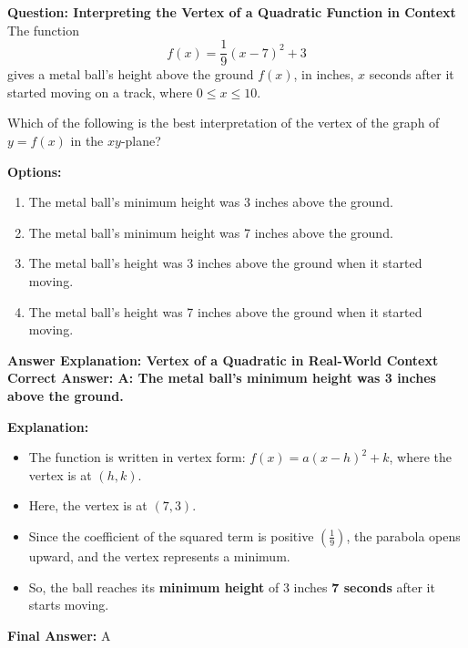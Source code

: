 \documentclass{beamer}
\begin{document}
\begin{frame}{\textbf{Question: Interpreting the Vertex of a Quadratic Function in Context}}
The function 
\[
f(x) = \frac{1}{9}(x - 7)^2 + 3
\]
gives a metal ball's height above the ground \(f(x)\), in inches, \(x\) seconds after it started moving on a track, where \(0 \leq x \leq 10\). 

Which of the following is the best interpretation of the vertex of the graph of \(y = f(x)\) in the \(xy\)-plane?

\vspace{0.4cm}
\textbf{Options:}
\begin{enumerate}
    \item[A] The metal ball's minimum height was 3 inches above the ground.
    \item[B] The metal ball's minimum height was 7 inches above the ground.
    \item[C] The metal ball's height was 3 inches above the ground when it started moving.
    \item[D] The metal ball's height was 7 inches above the ground when it started moving.
\end{enumerate}
\end{frame}

\begin{frame}{\textbf{Answer Explanation: Vertex of a Quadratic in Real-World Context}}
\textbf{Correct Answer: \textcolor{novelGreen}{A: The metal ball's minimum height was 3 inches above the ground.}}

\vspace{0.3cm}
\textbf{Explanation:}
\begin{itemize}
    \item The function is written in vertex form: \(f(x) = a(x - h)^2 + k\), where the vertex is at \((h, k)\).
    \item Here, the vertex is at \((7, 3)\).
    \item Since the coefficient of the squared term is positive \(\left(\frac{1}{9}\right)\), the parabola opens upward, and the vertex represents a minimum.
    \item So, the ball reaches its \textbf{minimum height} of 3 inches \textbf{7 seconds} after it starts moving.
\end{itemize}

\textbf{Final Answer:} \( \boxed{\text{A}} \)
\end{frame}
\end{document}
